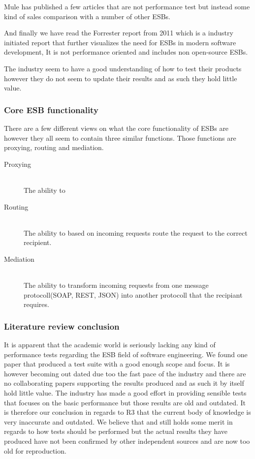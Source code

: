 \documentclass{llncs}
\begin{document}
Mule has published a few articles that are not performance test but instead some kind of sales comparison with a number of other ESBs\cite{mulevsjboss,mulevsglassfish,mulevsservicemix}.

And finally we have read the Forrester report \cite{forrester11} from 2011 which is a industry initiated report that further visualizes the need for ESBs in modern software development, It is not performance oriented and includes non open-source ESBs.

The industry seem to have a good understanding of how to test their products however they do not seem to update their results and as such they hold little value.

\subsubsection{Core ESB functionality}
There are a few different views on what the core functionality of ESBs are however they all seem to contain three similar functions. Those functions are proxying, routing and mediation. 

\begin{description}
	\item[Proxying] \hfill \\
			The ability to 
	\item[Routing] \hfill \\
			The ability to based on incoming requests route the request to the correct recipient.
	\item[Mediation] \hfill \\
			The ability to transform incoming requests from one message protocoll(SOAP, REST, JSON) into another protocoll that the recipiant requires.
\end{description}

\subsubsection{Literature review conclusion}

It is apparent that the academic world is seriously lacking any kind of performance tests regarding the ESB field of software engineering. We found one paper\cite{Sanjay2011} that produced a test suite with a good enough scope and focus. It is however becoming out dated due too the fast pace of the industry and there are no collaborating papers supporting the results produced and as such it by itself hold little value. The industry has made a good effort in providing sensible tests that focuses on the basic performance but those results are old and outdated. 
It is therefore our conclusion in regards to R3 that the current body of knowledge is very inaccurate and outdated. We believe that \cite{Sanjay2011} and \cite{Perera07,Perera07R2,Perera07R3,mulesoft08}still holds some merit in regards to how tests should be performed but the actual results they have produced have not been confirmed by other independent sources and are now too old for reproduction.
\end{document}
